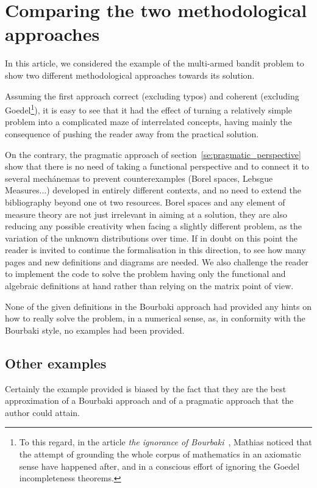 \documentclass[]{scrartcl}
\theoremstyle{definition}
\begin{document}
\section{Comparing the two methodological approaches}
\label{se:outro}
In this article, we considered the example of the multi-armed bandit problem to show two different methodological approaches towards its solution. 

Assuming the first approach correct (excluding typos) and coherent (excluding Goedel\footnote{
    To this regard, in the article \emph{the ignorance of Bourbaki}~\cite{mathias1992ignorance}, Mathias noticed that the attempt of grounding the whole corpus of mathematics in an axiomatic sense have happened after, and in a conscious effort of ignoring the Goedel incompleteness theorems.
}), it is easy to see that it had the effect of turning a relatively simple problem into a complicated maze of interrelated concepts, having mainly the consequence of pushing the reader away from the practical solution.

On the contrary, the pragmatic approach of section~\ref{se:pragmatic_perspective} show that there is no need of taking a functional perspective and to connect it to several mechánemas to prevent counterexamples (Borel spaces, Lebsgue Measures...) developed in entirely different contexts, and no need to extend the bibliography beyond one ot two resources. Borel spaces and any element of measure theory are not just irrelevant in aiming at a solution, they are also reducing any possible creativity when facing a slightly different problem, as the variation of the unknown distributions over time. If in doubt on this point the reader is invited to continue the formalisation in this direction, to see how many pages and new definitions and diagrams are needed. We also challenge the reader to implement the code to solve the problem having only the functional and algebraic definitions at hand rather than relying on the matrix point of view. 

None of the given definitions in the Bourbaki approach had provided any hints on how to really solve the problem, in a numerical sense, as, in conformity with the Bourbaki style, no examples had been provided. 

\subsection*{Other examples}

Certainly the example provided is biased by the fact that they are the best approximation of a Bourbaki approach and of a pragmatic approach that the author could attain.
\end{document}
